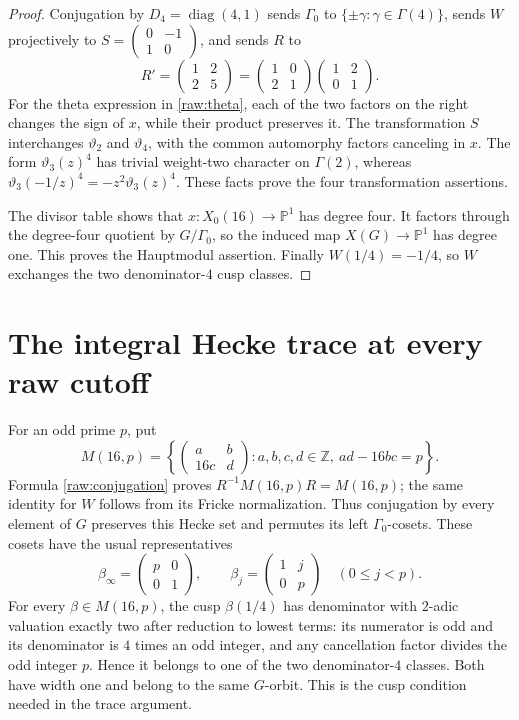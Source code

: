 \documentclass[11pt,a4paper]{article}
\begin{document}
\begin{proof}
Conjugation by $D_4=\operatorname{diag}(4,1)$ sends $\Gamma_0$ to
$\{\pm\gamma:\gamma\in\Gamma(4)\}$, sends $W$ projectively to
$S=\left(\begin{smallmatrix}0&-1\\1&0\end{smallmatrix}\right)$, and sends $R$ to
\[
 R'=\begin{pmatrix}1&2\\2&5\end{pmatrix}
   =\begin{pmatrix}1&0\\2&1\end{pmatrix}
    \begin{pmatrix}1&2\\0&1\end{pmatrix}.
\]
For the theta expression in \eqref{raw:theta}, each of the two factors on the
right changes the sign of $x$, while their product preserves it.
The transformation $S$ interchanges $\vartheta_2$ and $\vartheta_4$, with
the common automorphy factors canceling in $x$.  The form
$\vartheta_3(z)^4$ has trivial weight-two character on $\Gamma(2)$, whereas
$\vartheta_3(-1/z)^4=-z^2\vartheta_3(z)^4$.  These facts prove the four
transformation assertions.

The divisor table shows that $x:X_0(16)\to\mathbb P^1$ has degree four.
It factors through the degree-four quotient by $G/\Gamma_0$, so the induced
map $X(G)\to\mathbb P^1$ has degree one.  This proves the Hauptmodul assertion.
Finally $W(1/4)=-1/4$, so $W$ exchanges the two denominator-$4$ cusp classes.
\end{proof}

\section{The integral Hecke trace at every raw cutoff}\label{sec:rawtrace}

For an odd prime $p$, put
\[
 M(16,p)=\left\{\begin{pmatrix}a&b\\16c&d\end{pmatrix}:
 a,b,c,d\in\mathbb Z,\ ad-16bc=p\right\}.
\]
Formula \eqref{raw:conjugation} proves
$R^{-1}M(16,p)R=M(16,p)$; the same identity for $W$ follows from its Fricke
normalization.  Thus conjugation by every element of $G$ preserves this
Hecke set and permutes its left $\Gamma_0$-cosets.
These cosets have the usual representatives
\[
 \beta_\infty=\begin{pmatrix}p&0\\0&1\end{pmatrix},\qquad
 \beta_j=\begin{pmatrix}1&j\\0&p\end{pmatrix}
 \quad(0\leq j<p).
\]
For every $\beta\in M(16,p)$, the cusp $\beta(1/4)$ has denominator with
$2$-adic valuation exactly two after reduction to lowest terms: its
numerator is odd and its denominator is $4$ times an odd integer, and any
cancellation factor divides the odd integer $p$.  Hence it belongs to one
of the two denominator-$4$ classes.  Both have width one and belong to the
same $G$-orbit.  This is the cusp condition needed in the trace argument.
\end{document}

